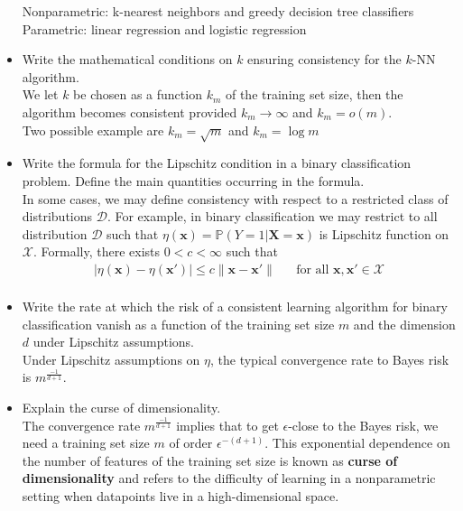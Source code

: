 \begin{itemize}
        Nonparametric: k-nearest neighbors and greedy decision tree classifiers\\
        Parametric: linear regression and logistic regression\\

    \item Write the mathematical conditions on $k$ ensuring consistency for the $k$-NN algorithm.\\

    We let $k$ be chosen as a function $k_m$ of the training set size, then the algorithm becomes consistent provided $k_m \rightarrow \infty$ and $k_m = o(m)$.\\
    Two possible example are $k_m = \sqrt{m}$ and $k_m = \log{m}$\\

    \item Write the formula for the Lipschitz condition in a binary classification problem. Define the main quantities occurring in the formula.\\

        In some cases, we may define consistency with respect to a restricted class of distributions $\mathcal{D}$. For example, in binary classification we may restrict to all distribution $\mathcal{D}$ such that $\eta(\boldsymbol{x}) = \mathbb{P}(Y = 1 | \boldsymbol{X} = \boldsymbol{x})$ is Lipschitz function on $\mathcal{X}$. Formally, there exists $0 < c < \infty$ such that
        \begin{equation} 
            \begin{aligned}
                |\eta(\boldsymbol{x}) - \eta(\boldsymbol{x}')| \leq c \|\boldsymbol{x} - \boldsymbol{x}'\| && \text{for all $\boldsymbol{x}, \boldsymbol{x}' \in \mathcal{X}$} \\ 
            \end{aligned}
        \end{equation}

    \item Write the rate at which the risk of a consistent learning algorithm for binary classification vanish as a function of the training set size $m$ and the dimension $d$ under Lipschitz assumptions.\\

        Under Lipschitz assumptions on $\eta$, the typical convergence rate to Bayes risk is $m^{\frac{-1}{d+1}}$.\\

    \item Explain the curse of dimensionality.\\
    
        The convergence rate $m^{\frac{-1}{d+1}}$ implies that to get $\epsilon$-close to the Bayes risk, we need a training set size $m$ of order $\epsilon^{-(d+1)}$. This exponential dependence on the number of features of the training set size is known as \textbf{curse of dimensionality} and refers to the difficulty of learning in a nonparametric setting when datapoints live in a high-dimensional space.\\
    

\end{itemize}
